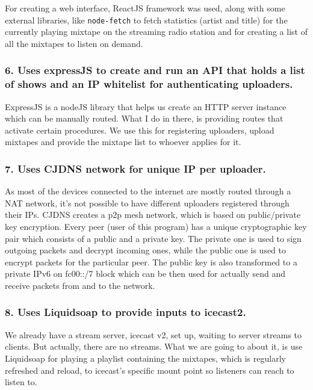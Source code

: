 \documentclass[12pt]{report}
\begin{document}
For creating a web interface, ReactJS framework was used, along with
some external libraries, like \texttt{node-fetch} to fetch statistics
(artist and title) for the currently playing mixtape on the streaming
radio station and for creating a list of all the mixtapes to listen on
demand.


\subsubsection{6. Uses expressJS to create and run an API that holds a list
of shows and an IP whitelist for authenticating
uploaders.}\label{uses-expressjs-to-create-and-run-an-api-that-holds-a-list-of-shows-and-an-ip-whitelist-for-authenticating-uploaders.}

ExpressJS is a nodeJS library that helps us create an HTTP server
instance which can be manually routed. What I do in there, is providing
routes that activate certain procedures. We use this for registering
uploaders, upload mixtapes and provide the mixtape list to whoever
applies for it.


\subsubsection{7. Uses CJDNS network for unique IP per
uploader.}\label{uses-cjdns-network-for-unique-ip-per-uploader.}

As most of the devices connected to the internet are mostly routed
through a NAT network, it's not possible to have different uploaders
registered through their IPs. CJDNS creates a p2p mesh network, which is
based on public/private key encryption. Every peer (user of this
program) has a unique cryptographic key pair which consists of a public
and a private key. The private one is used to sign outgoing packets and
decrypt incoming ones, while the public one is used to encrypt packets
for the particular peer. The public key is also transformed to a private
IPv6 on fc00::/7 block which can be then used for actually send and
receive packets from and to the network.


\subsubsection{8. Uses Liquidsoap to provide inputs to
icecast2.}\label{uses-liquidsoap-to-provide-inputs-to-icecast2.}

We already have a stream server, icecast v2, set up, waiting to server
streams to clients. But actually, there are no streams. What we are
going to about it, is use Liquidsoap for playing a playlist containing
the mixtapes, which is regularly refreshed and reload, to icecast's
specific mount point so listeners can reach to listen to.
\end{document}
